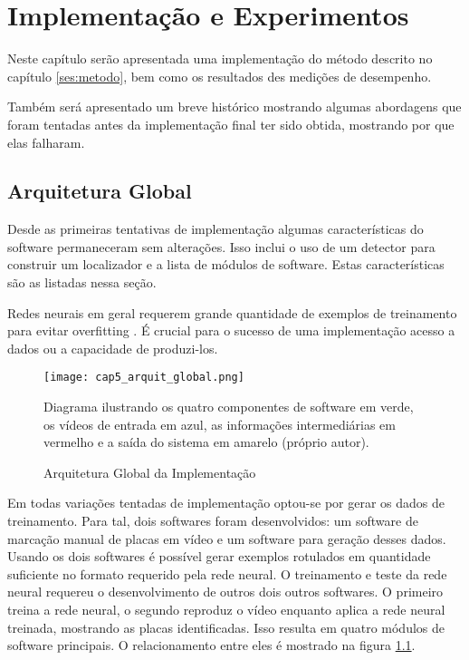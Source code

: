 
\chapter{Implementação e Experimentos}

Neste capítulo serão apresentada uma implementação do método descrito
no capítulo \ref{ses:metodo}, bem como os resultados des medições de
desempenho.

Também será apresentado um breve histórico mostrando algumas abordagens que
foram tentadas antes da implementação final ter sido obtida, mostrando por que
elas falharam.

\section{Arquitetura Global}
Desde as primeiras tentativas de implementação algumas características do
software permaneceram sem alterações. Isso inclui o uso de um detector para
construir um localizador e a lista de módulos de software. Estas
características são as listadas nessa seção.

Redes neurais em geral requerem grande quantidade de exemplos de treinamento
para evitar overfitting \cite{hawkins2004problem}. É crucial para o
sucesso de uma implementação acesso a dados ou a capacidade de produzi-los.

\begin{figure}[!htb]
	\centering
	\texttt{[image: cap5\_arquit\_global.png]}
	\caption{Arquitetura Global da Implementação}
	\label{fig:cap5_arquit_global}
	Diagrama ilustrando os quatro componentes de software em verde, os vídeos
	de entrada em azul, as informações intermediárias em vermelho e a saída do
	sistema em amarelo (próprio autor).
\end{figure}

Em todas variações tentadas de implementação optou-se por gerar os dados de
treinamento. Para tal, dois softwares foram desenvolvidos: um software de
marcação manual de placas em vídeo e um software para geração desses dados.
Usando os dois softwares é possível gerar exemplos rotulados em quantidade
suficiente no formato requerido pela rede neural. O treinamento e teste da rede
neural requereu o desenvolvimento de outros dois outros softwares. O primeiro
treina a rede neural, o segundo reproduz o vídeo enquanto aplica a rede neural
treinada, mostrando as placas identificadas. Isso resulta em quatro módulos de
software principais. O relacionamento entre eles é mostrado na figura
\ref{fig:cap5_arquit_global}.

